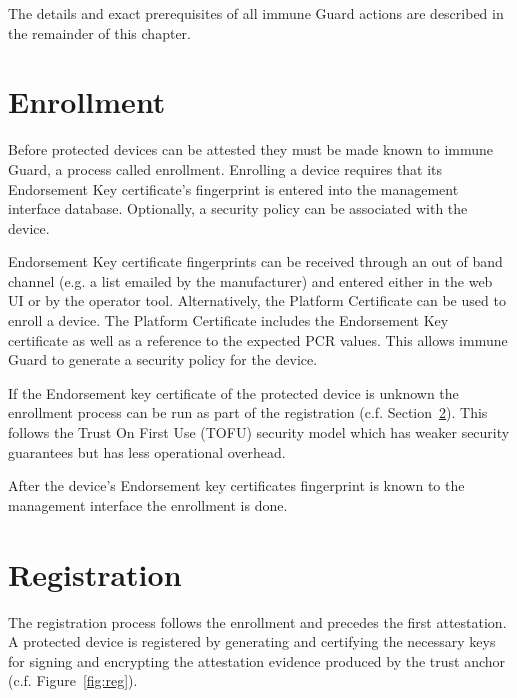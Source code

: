 \documentclass[a4paper,oneside,10pt,extrafontsizes]{memoir}
\newcommand\todo[1]{\textcolor{red}{TODO: #1\newline}}
\begin{document}
The details and exact prerequisites of all immune Guard actions are described in
the remainder of this chapter.

\section{Enrollment}
\label{sec:enroll}

Before protected devices can be attested they must be made known to immune Guard,
a process called enrollment. Enrolling a device requires that its Endorsement Key
certificate's fingerprint is entered into the management interface database.
Optionally, a security policy can be associated with the device.

Endorsement Key certificate fingerprints can be received through an out of band
channel (e.g. a list emailed by the manufacturer) and entered either in the web
UI or by the operator tool. Alternatively, the Platform Certificate can be used
to enroll a device. The Platform Certificate includes the Endorsement Key
certificate as well as a reference to the expected PCR values. This allows
immune Guard to generate a security policy for the device.

If the Endorsement key certificate of the protected device is unknown the
enrollment process can be run as part of the registration (c.f.
Section~\ref{sec:reg}). This follows the Trust On First Use (TOFU) security
model which has weaker security guarantees but has less operational overhead.

After the device's Endorsement key certificates fingerprint is known to the
management interface the enrollment is done.

%

\section{Registration}
\label{sec:reg}

The registration process follows the enrollment and precedes the first
attestation. A protected device is registered by generating and certifying the
necessary keys for signing and encrypting the attestation evidence produced by
the trust anchor (c.f. Figure~\ref{fig:reg}). 
\end{document}
